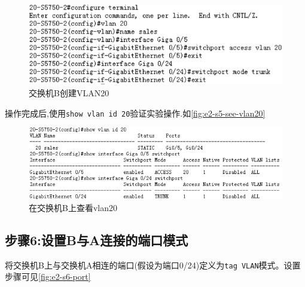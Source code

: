 \documentclass{myreport}
\begin{document}
\begin{figure}[htp]
    \centering
    \includegraphics[width=13cm]{"./figure/2018-05-17-22-53-53.png"}
    \caption{交换机B创建VLAN20}
    \label{fig:e2-s5-vlan20}
\end{figure}



操作完成后,使用\texttt{show vlan id 20}验证实验操作.如\autoref{fig:e2-s5-see-vlan20}

\begin{figure}[htp]
    \centering
    \includegraphics[width=13cm]{"./figure/2018-05-17-22-52-52.png"}
    \caption{在交换机B上查看vlan20}
    \label{fig:e2-s5-see-vlan20}
\end{figure}


\subsection{步骤6:设置B与A连接的端口模式}


将交换机B上与交换机A相连的端口(假设为端口0/24)定义为\texttt{tag VLAN}模式。设置步骤可见\autoref{fig:e2-s6-port}
\end{document}
